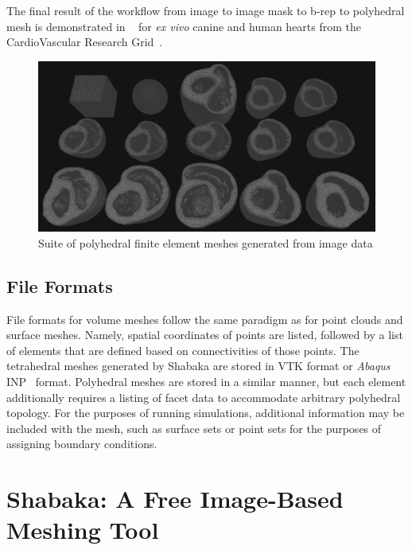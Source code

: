 The final result of the workflow from image to image mask to b-rep to polyhedral mesh is demonstrated in ~ for \textit{ex vivo} canine and human hearts from the CardioVascular Research Grid~\cite{cvgg}.

\begin{figure}
\centering
\includegraphics[width=1.0\textwidth]{media/3-celeris/7-suite.png}
\caption{Suite of polyhedral finite element meshes generated from image data \vspace{1cm}}
\label{fig:celsuite}
\end{figure}

\subsection{File Formats}
\label{File Formats-MESH}
File formats for volume meshes follow the same paradigm as for point clouds and surface meshes. Namely, spatial coordinates of points are listed, followed by a list of elements that are defined based on connectivities of those points. The tetrahedral meshes generated by Shabaka are stored in VTK format or \textit{Abaqus} INP~\cite{abaqus} format. Polyhedral meshes are stored in a similar manner, but each element additionally requires a listing of facet data to accommodate arbitrary polyhedral topology. For the purposes of running simulations, additional information may be included with the mesh, such as surface sets or point sets for the purposes of assigning boundary conditions.

\section{Shabaka: A Free Image-Based Meshing Tool}

